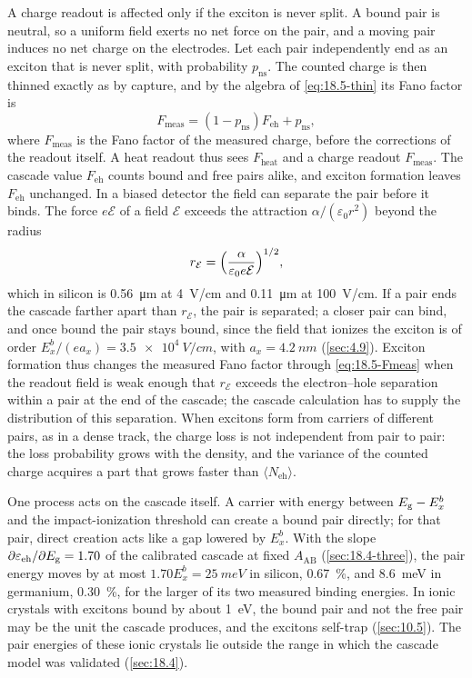 A charge readout is affected only if the exciton is never split. A bound pair is neutral, so a uniform field exerts no net force on the pair, and a moving pair induces no net charge on the electrodes. Let each pair independently end as an exciton that is never split, with probability $p_{\mathrm{ns}}$. The counted charge is then thinned exactly as by capture, and by the algebra of \cref{eq:18.5-thin} its Fano factor is
\begin{equation}
  F_{\mathrm{meas}} = (1 - p_{\mathrm{ns}})F_{\mathrm{eh}} + p_{\mathrm{ns}} ,
  \label{eq:18.5-Fmeas}
\end{equation}
where $F_{\mathrm{meas}}$ is the Fano factor of the measured charge, before the corrections of the readout itself. A heat readout thus sees $F_{\mathrm{heat}}$ and a charge readout $F_{\mathrm{meas}}$. The cascade value $F_{\mathrm{eh}}$ counts bound and free pairs alike, and exciton formation leaves $F_{\mathrm{eh}}$ unchanged. In a biased detector the field can separate the pair before it binds. The force $e\mathcal{E}$ of a field $\mathcal{E}$ exceeds the attraction $\alpha/(\varepsilon_0r^2)$ beyond the radius
\begin{equation}
  r_{\mathcal{E}} = \Bigl(\frac{\alpha}{\varepsilon_0e\mathcal{E}}\Bigr)^{1/2} ,
  \label{eq:18.5-rfield}
\end{equation}
which in silicon is \SI{0.56}{\micro m} at \SI{4}{V/cm} and \SI{0.11}{\micro m} at \SI{100}{V/cm}. If a pair ends the cascade farther apart than $r_{\mathcal{E}}$, the pair is separated; a closer pair can bind, and once bound the pair stays bound, since the field that ionizes the exciton is of order $E_x^b/(ea_x) = \SI{3.5e4}{V/cm}$, with $a_x = \SI{4.2}{nm}$ (\cref{sec:4.9}). Exciton formation thus changes the measured Fano factor through \cref{eq:18.5-Fmeas} when the readout field is weak enough that $r_{\mathcal{E}}$ exceeds the electron--hole separation within a pair at the end of the cascade; the cascade calculation has to supply the distribution of this separation. When excitons form from carriers of different pairs, as in a dense track, the charge loss is not independent from pair to pair: the loss probability grows with the density, and the variance of the counted charge acquires a part that grows faster than $\langle N_{\mathrm{eh}}\rangle$.

One process acts on the cascade itself. A carrier with energy between $E_{\mathrm{g}} - E_x^b$ and the impact-ionization threshold can create a bound pair directly; for that pair, direct creation acts like a gap lowered by $E_x^b$. With the slope $\partial\varepsilon_{\mathrm{eh}}/\partial E_{\mathrm{g}} = 1.70$ of the calibrated cascade at fixed $A_{\mathrm{AB}}$ (\cref{sec:18.4-three}), the pair energy moves by at most $1.70E_x^b = \SI{25}{meV}$ in silicon, \SI{0.67}{\percent}, and \SI{8.6}{meV} in germanium, \SI{0.30}{\percent}, for the larger of its two measured binding energies. In ionic crystals with excitons bound by about \SI{1}{eV}, the bound pair and not the free pair may be the unit the cascade produces, and the excitons self-trap (\cref{sec:10.5}). The pair energies of these ionic crystals lie outside the range in which the cascade model was validated (\cref{sec:18.4}).

